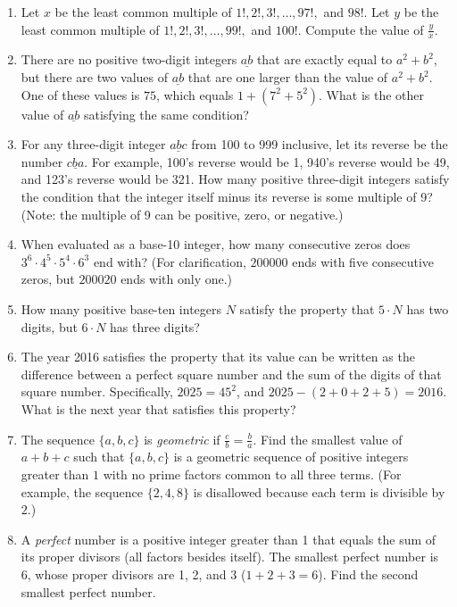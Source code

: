 \documentclass[11pt]{article}
\begin{document}
\begin{enumerate}[1.]
			\item Let $x$ be the least common multiple of $1!, 2!, 3!, \ldots, 97!,$ and $98!$. Let $y$ be the least common multiple of $1!, 2!, 3!, \ldots, 99!,$ and $100!$. Compute the value of $\frac{y}{x}$.
			
			\item There are no positive two-digit integers $\underline{ab}$ that are exactly equal to $a^2 + b^2$, but there are two values of $\underline{ab}$ that are one larger than the value of $a^2 + b^2$. One of these values is $75$, which equals $1 + \left(7^2 + 5^2\right)$. What is the other value of $\underline{ab}$ satisfying the same condition?
			
			\item For any three-digit integer $\underline{abc}$ from 100 to 999 inclusive, let its reverse be the number $\underline{cba}$. For example, 100's reverse would be 1, 940's reverse would be 49, and 123's reverse would be 321. How many positive three-digit integers satisfy the condition that the integer itself minus its reverse is some multiple of 9? (Note: the multiple of 9 can be positive, zero, or negative.)
			
			\item When evaluated as a base-10 integer, how many consecutive zeros does $3^6\cdot4^5\cdot5^4\cdot6^3$ end with? (For clarification, $200000$ ends with five consecutive zeros, but $200020$ ends with only one.)
			
			\item How many positive base-ten integers $N$ satisfy the property that $5\cdot N$ has two digits, but $6\cdot N$ has three digits?
			
			\item The year 2016 satisfies the property that its value can be written as the difference between a perfect square number and the sum of the digits of that square number. Specifically, $2025 = 45^2$, and $2025 - (2 + 0 + 2 + 5) = 2016$. What is the next year that satisfies this property?
			
			\item The sequence $\{a, b, c\}$ is \textit{geometric} if $\frac{c}{b} = \frac{b}{a}$. Find the smallest value of $a + b + c$ such that $\{a, b, c\}$ is a geometric sequence of positive integers greater than $1$ with no prime factors common to all three terms. (For example, the sequence $\{2, 4, 8\}$ is disallowed because each term is divisible by $2$.)
			
			\item A \textit{perfect} number is a positive integer greater than 1 that equals the sum of its proper divisors (all factors besides itself). The smallest perfect number is 6, whose proper divisors are 1, 2, and 3 ($1 + 2 + 3 = 6$). Find the second smallest perfect number.
			

\end{enumerate}
\end{document}
